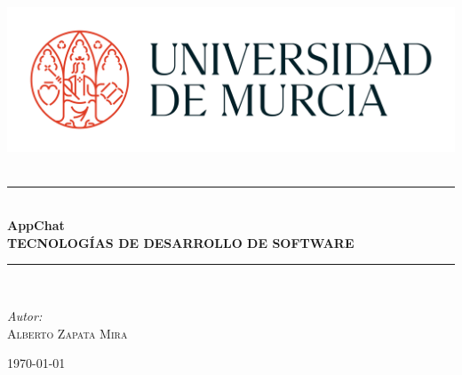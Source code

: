 \begin{titlepage}
    \begin{center}
    
    \includegraphics[width=\textwidth]{images/LogosimboloUMU-positivo.png}\\[1cm]
    
    \textsc{\Large }\\[0.5cm]
    
    \rule{\linewidth}{0.5mm} \\[0.4cm]
    
    {\huge \bfseries AppChat\\[0.2cm]
    TECNOLOGÍAS DE DESARROLLO DE SOFTWARE \\[0.4cm] }
    
    \rule{\linewidth}{0.5mm} \\[1.5cm]
    
    \begin{minipage}{0.4\textwidth}
    \begin{flushleft} \large
    \emph{Autor:}\\
    \textsc{Alberto Zapata Mira}\\
    \end{flushleft}
    \end{minipage}
    
    \vfill
    
    {\large \today}
    
    \end{center}
    \end{titlepage}